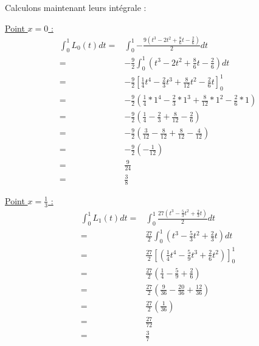 \documentclass{article}
\begin{document}
\begin{enumerate}
Calculons maintenant leurs intégrale :

\underline{Point $x = 0$ :}
\begin{equation*}
  \begin{split}
    \int_0^1 {L_0(t)dt} = & \int_0^1 {- \frac{ 9 (t^3 - 2t^2 +
        \frac{8}{6}t - \frac{2}{6}) } {2} dt} \\
    = & - \frac{9}{2} \int_0^1 {\left(t^3 - 2t^2 +
      \frac{8}{6}t - \frac{2}{6} \right)  dt} \\
    = & - \frac{9}{2} \left[ \frac{1}{4}t^4 - \frac{2}{3}t^3 +
      \frac{8}{12}t^2 - \frac{2}{6}t  \right]_0^1 \\
    = & - \frac{9}{2} \left(\frac{1}{4} * 1^4 - \frac{2}{3} * 1^3 +
    \frac{8}{12} * 1^2 - \frac{2}{6} * 1 \right)  \\
    = & - \frac{9}{2} \left(\frac{1}{4} - \frac{2}{3} +
    \frac{8}{12} - \frac{2}{6} \right)  \\
    = & - \frac{9}{2} \left(\frac{3}{12} - \frac{8}{12} +
    \frac{8}{12} - \frac{4}{12} \right)  \\
    = & - \frac{9}{2} \left(- \frac{1}{12} \right)  \\
    = & \frac{9}{24} \\
    = & \frac{3}{8}
  \end{split}
\end{equation*}

\underline{Point $x = \frac{1}{3}$ :}
\begin{equation*}
  \begin{split}
    \int_0^1 {L_1(t) dt} = & \int_0^1 {\frac{27 (t^3 - \frac{5}{3}t^2 + \frac{2}{3}t)}
      {2} dt} \\
    = & \frac{27}{2} \int_0^1 { \left( t^3 - \frac{5}{3}t^2 + \frac{2}{3}t \right) 
      dt} \\
    = & \frac{27}{2} \left[ \left( \frac{1}{4}t^4 - \frac{5}{9}t^3 +
      \frac{2}{6}t^2 \right) \right]_0^1 \\
    = & \frac{27}{2} \left( \frac{1}{4} - \frac{5}{9} + \frac{2}{6} \right)  \\
    = & \frac{27}{2} \left( \frac{9}{36} - \frac{20}{36} + \frac{12}{36} \right)  \\
    = & \frac{27}{2} \left(  \frac{1}{36} \right)  \\
    = & \frac{27}{72} \\
    = & \frac{3}{7}
  \end{split}
\end{equation*}


\end{enumerate}
\end{document}
